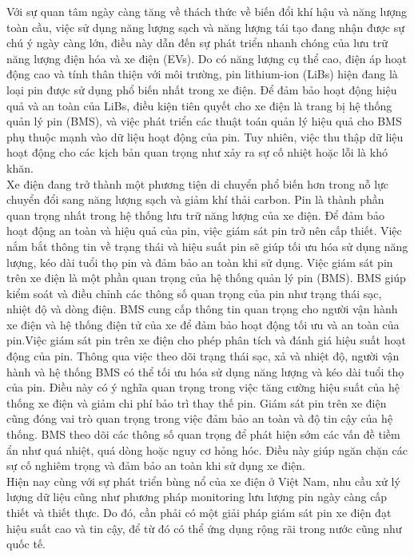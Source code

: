 \documentclass[a4paper,11pt]{article}
\theoremstyle{mytheor}
\begin{document}
Với sự quan tâm ngày càng tăng về thách thức về biến đổi khí hậu và năng lượng toàn cầu, việc sử dụng năng lượng sạch và năng lượng tái tạo đang nhận được sự chú ý ngày càng lớn, điều này dẫn đến sự phát triển nhanh chóng của lưu trữ năng lượng điện hóa và xe điện (EVs). Do có năng lượng cụ thể cao, điện áp hoạt động cao và tính thân thiện với môi trường, pin lithium-ion (LiBs) hiện đang là loại pin được sử dụng phổ biến nhất trong xe điện. Để đảm bảo hoạt động hiệu quả và an toàn của LiBs, điều kiện tiên quyết cho xe điện là trang bị hệ thống quản lý pin (BMS), và việc phát triển các thuật toán quản lý hiệu quả cho BMS phụ thuộc mạnh vào dữ liệu hoạt động của pin. Tuy nhiên, việc thu thập dữ liệu hoạt động cho các kịch bản quan trọng như xảy ra sự cố nhiệt hoặc lỗi là khó khăn.\\
	Xe điện đang trở thành một phương tiện di chuyển phổ biến hơn trong nỗ lực chuyển đổi sang năng lượng sạch và giảm khí thải carbon. Pin là thành phần quan trọng nhất trong hệ thống lưu trữ năng lượng của xe điện. Để đảm bảo hoạt động an toàn và hiệu quả của pin, việc giám sát pin trở nên cấp thiết. Việc nắm bắt thông tin về trạng thái và hiệu suất pin sẽ giúp tối ưu hóa sử dụng năng lượng, kéo dài tuổi thọ pin và đảm bảo an toàn khi sử dụng. Việc giám sát pin trên xe điện là một phần quan trọng của hệ thống quản lý pin (BMS). BMS giúp kiểm soát và điều chỉnh các thông số quan trọng của pin như trạng thái sạc, nhiệt độ và dòng điện. BMS cung cấp thông tin quan trọng cho người vận hành xe điện và hệ thống điện tử của xe để đảm bảo hoạt động tối ưu và an toàn của pin.Việc giám sát pin trên xe điện cho phép phân tích và đánh giá hiệu suất hoạt động của pin. Thông qua việc theo dõi trạng thái sạc, xả và nhiệt độ, người vận hành và hệ thống BMS có thể tối ưu hóa sử dụng năng lượng và kéo dài tuổi thọ của pin. Điều này có ý nghĩa quan trọng trong việc tăng cường hiệu suất của hệ thống xe điện và giảm chi phí bảo trì thay thế pin. Giám sát pin trên xe điện cũng đóng vai trò quan trọng trong việc đảm bảo an toàn và độ tin cậy của hệ thống. BMS theo dõi các thông số quan trọng để phát hiện sớm các vấn đề tiềm ẩn như quá nhiệt, quá dòng hoặc nguy cơ hỏng hóc. Điều này giúp ngăn chặn các sự cố nghiêm trọng và đảm bảo an toàn khi sử dụng xe điện.\\
Hiện nay cùng với sự phát triển bùng nổ của xe điện ở Việt Nam, nhu cầu xử lý lượng dữ liệu cũng như phương pháp monitoring lưu lượng pin ngày càng cấp thiết và thiết thực. Do đó, cần phải có một giải pháp giám sát pin xe điện đạt hiệu suất cao và tin cậy, để từ đó có thể ứng dụng rộng rãi trong nước cũng như quốc tế. 
\end{document}
